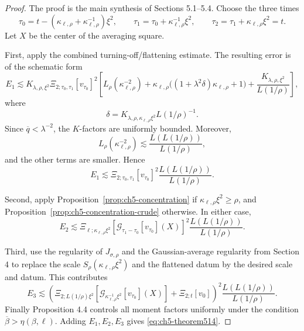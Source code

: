 \documentclass[11pt]{article}
\theoremstyle{definition}
\theoremstyle{remark}
\newcommand{\hsemig}[2]{\mathcal{G}_{#1}\left[{#2}\right]}
\newcommand{\Srho}{S_{\rho}}
\newcommand{\Lrho}{L_{\rho}}
\begin{document}
\begin{proof}
The proof is the main synthesis of Sections 5.1--5.4. Choose the three times
\[
\tau_0=t-(\kappa_{\ell,\rho}+\kappa_{\ell,\rho}^{-1})\xi^2,
\qquad
\tau_1=\tau_0+\kappa_{\ell,\rho}^{-1}\xi^2,
\qquad
\tau_2=\tau_1+\kappa_{\ell,\rho}\xi^2=t.
\]
Let \(X\) be the center of the averaging square.

First, apply the combined turning-off/flattening estimate. The resulting error is of the schematic form
\begin{equation}\label{eq:ch5-E1}
E_1
\lesssim
K_{\lambda,\rho,\xi^2}\Xi_{2;\tau_0,\tau_1}[v_{\tau_0}]^2
\left[
\Lrho(\kappa_{\ell,\rho}^{-2})
+\kappa_{\ell,\rho}\big((1+\lambda^2\delta)\kappa_{\ell,\rho}+1\big)
+\frac{K_{\lambda,\rho,\xi^2}}{L(1/\rho)}
\right],
\end{equation}
where
\[
\delta=K_{\lambda,\rho,\kappa_{\ell,\rho}\xi^2}L(1/\rho)^{-1}.
\]
Since \(\overline q<\lambda^{-2}\), the \(K\)-factors are uniformly bounded. Moreover,
\[
\Lrho(\kappa_{\ell,\rho}^{-2})
\lesssim \frac{L(L(1/\rho))}{L(1/\rho)},
\]
and the other terms are smaller. Hence
\begin{equation}\label{eq:ch5-E1final}
E_1\lesssim
\Xi_{2;\tau_0,\tau_1}[v_{\tau_0}]^2
\frac{L(L(1/\rho))}{L(1/\rho)}.
\end{equation}

Second, apply Proposition~\ref{prop:ch5-concentration} if
\(\kappa_{\ell,\rho}\xi^2\ge\rho\), and Proposition~\ref{prop:ch5-concentration-crude} otherwise. In either case,
\begin{equation}\label{eq:ch5-E2final}
E_2\lesssim
\Xi_{\ell;\kappa_{\ell,\rho}\xi^2}
[\hsemig{\tau_1-\tau_0}{v_{\tau_0}}(X)]^2
\frac{L(L(1/\rho))}{L(1/\rho)}.
\end{equation}

Third, use the regularity of \(J_{\sigma,\rho}\) and the Gaussian-average regularity from Section 4 to replace the scale \(\Srho(\kappa_{\ell,\rho}\xi^2)\) and the flattened datum by the desired scale and datum. This contributes
\begin{equation}\label{eq:ch5-E3final}
E_3\lesssim
\left(
\Xi_{2;L(1/\rho)\xi^2}[\hsemig{\kappa_{\ell,\rho}^{-1}\xi^2}{v_{\tau_0}}(X)]
+\Xi_{2;t}[v_0]
\right)^2
\frac{L(L(1/\rho))}{L(1/\rho)}.
\end{equation}
Finally Proposition 4.4 controls all moment factors uniformly under the condition
\(\overline\beta>\eta(\beta,\ell)\). Adding \(E_1,E_2,E_3\) gives \eqref{eq:ch5-theorem514}.
\end{proof}
\end{document}

